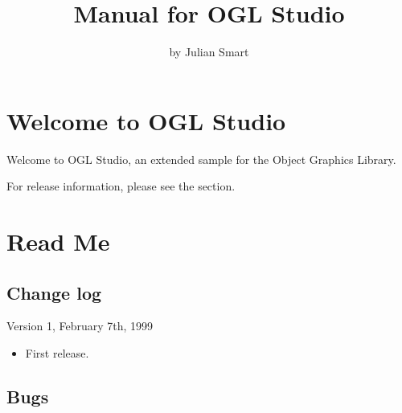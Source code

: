 %
\twocolwidtha{4cm}%

\newcommand{\commandref}[2]{\helpref{{\tt $\backslash$#1}}{#2}}%
\newcommand{\commandrefn}[2]{\helprefn{{\tt $\backslash$#1}}{#2}\index{#1}}%
\newcommand{\commandpageref}[2]{\latexignore{\helprefn{{\tt $\backslash$#1}}{#2}}\latexonly{{\tt $\backslash$#1} {\it page \pageref{#2}}}\index{#1}}%
\newcommand{\indexit}[1]{#1\index{#1}}%
\newcommand{\inioption}[1]{{\tt #1}\index{#1}}%
\parskip=10pt%
\parindent=0pt%
\title{Manual for OGL Studio}%
\author{by Julian Smart}%
\makeindex%
%
\maketitle%
\pagestyle{fancyplain}%
%
%
%
\setfooter{\thepage}{}{}{}{}{\thepage}%
\tableofcontents%

\chapter{Welcome to OGL Studio}%
%
\setfooter{\thepage}{}{}{}{}{\thepage}%

Welcome to OGL Studio, an extended sample for the Object Graphics Library.

For release information, please see the  section.

\chapter{Read Me}\label{readme}%
%
\setfooter{\thepage}{}{}{}{}{\thepage}%

\section{Change log}

Version 1, February 7th, 1999

\begin{itemize}\itemsep=0pt
\item First release.
\end{itemize}

\section{Bugs}

